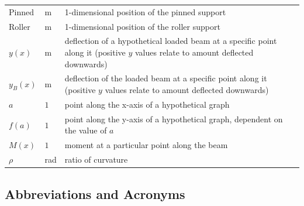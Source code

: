\documentclass[12pt]{article}
\begin{document}
\begin{longtable}{l l p{12cm}}
    \(\text{Pinned}\) & \si{\metre}            & 1-dimensional position of the pinned support                                                                                                   \\
    \(\text{Roller}\) & \si{\metre}            & 1-dimensional position of the roller support                                                                                                   \\
    \(y(x)\)          & \si{\metre}            & deflection of a hypothetical loaded beam at a specific point along it (positive $y$ values relate to amount deflected downwards)               \\
    \(y_{B}(x)\)      & \si{\metre}            & deflection of the loaded beam at a specific point along it (positive $y$ values relate to amount deflected downwards)                          \\
    \(a\)             & \(1\)                  & point along the x-axis of a hypothetical graph                                                                                                 \\
    \(f(a)\)          & \(1\)                  & point along the y-axis of a hypothetical graph, dependent on the value of $a$                                                                  \\
    \(M(x)\)          & \(1\)                  & moment at a particular point along the beam                                                                                                    \\
    \(\rho\)          & \si{\radian}           & ratio of curvature                                                                                                                             \\
    \bottomrule
\end{longtable}

\subsection{Abbreviations and Acronyms}

\renewcommand{\arraystretch}{1.2}
\end{document}
